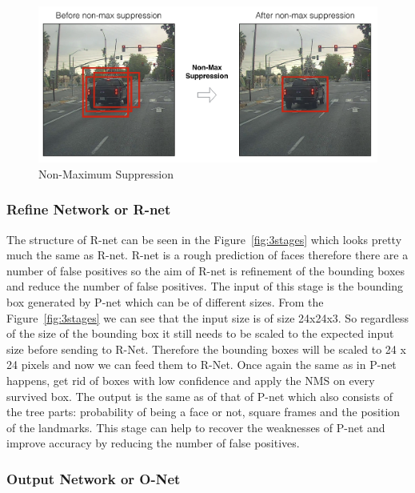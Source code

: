 \begin{figure}[!htb]
    \centering
    \includegraphics[width=1\textwidth]{figures/non-max.png}
    \caption{ Non-Maximum Suppression}
    \label{fig:non-max}
\end{figure}
\subsubsection{Refine Network or R-net}

The structure of R-net can be seen in the Figure~\ref{fig:3stages} which looks pretty much the same as R-net. R-net is a rough prediction of faces therefore there are a number of false positives so the aim of R-net is refinement of the bounding boxes and reduce the number of false positives.
The input of this stage is the bounding box generated by P-net which can be of different sizes. From the Figure~\ref{fig:3stages} we can see that the input size is of size 24x24x3. So regardless of the size of the bounding box it still needs to be scaled to the expected input size before sending to R-Net. Therefore the bounding boxes will be scaled to 24 x 24 pixels and now we can feed them to R-Net. Once again the same as in P-net happens, get rid of boxes with low confidence and apply the NMS on every survived box. The output is the same as of that of P-net which also consists of the tree parts: probability of being a face or not, square frames and the position of the landmarks. This stage can help to recover the weaknesses of P-net and improve accuracy by reducing the number of false positives. 


\subsubsection{Output Network or O-Net}

